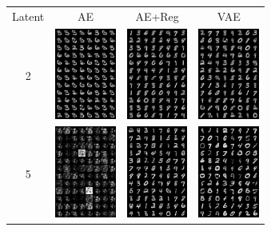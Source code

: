 \documentclass[conference]{IEEEtran}
\begin{document}
\begin{figure}[H]
	\centering
	\begin{tabular}{cccc}
		Latent & AE & AE+Reg & VAE \\[1mm]
		2&
		\includegraphics[width=2cm]{fig/mnist-2-false.png}&
		\includegraphics[width=2cm]{fig/mnist-2-true.png}&
		\includegraphics[width=2cm]{fig/mnist-2-vae.png}\\
		5&
		\includegraphics[width=2cm]{fig/mnist-5-false.png}&
		\includegraphics[width=2cm]{fig/mnist-5-true.png}&
                \includegraphics[width=2cm]{fig/mnist-5-vae.png}\\

\end{tabular}
\end{figure}
\end{document}
